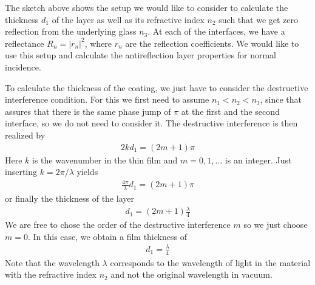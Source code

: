 \documentclass[letterpaper,10pt,english]{sphinxmanual}
\begin{document}
The sketch above shows the setup we would like to consider to calculate the thickness \(d_1\) of the layer as well as its refractive index \(n_2\) such that we get zero reflection from the underlying glass \(n_3\). At each of the interfaces, we have a reflectance \(R_n=|r_n|^2\), where \(r_n\) are the reflection coefficients. We would like to use this setup and calculate the anti\sphinxhyphen{}reflection layer properties for normal incidence.


To calculate the thickness of the coating, we just have to consider the destructive interference condition. For this we first need to assume \(n_1<n_2<n_3\), since that assures that there is the same phase jump of \(\pi\) at the first and the second interface, so we do not need to consider it. The destructive interference is then realized by
\begin{equation*}
\begin{split}2k d_1=(2m+1)\pi\end{split}
\end{equation*}
Here \(k\) is the wavenumber in the thin film and \(m=0,1,\ldots\) is an integer. Just inserting \(k=2\pi/\lambda\) yields
\begin{equation*}
\begin{split}\frac{4\pi}{\lambda} d_1=(2m+1)\pi\end{split}
\end{equation*}
or finally the thickness of the layer
\begin{equation*}
\begin{split}d_1=(2m+1)\frac{\lambda}{4}\end{split}
\end{equation*}
We are free to chose the order of the destructive interference \(m\) so we just choose \(m=0\). In this case, we obtain a film thickness of
\begin{equation*}
\begin{split}d_1=\frac{\lambda}{4}\end{split}
\end{equation*}
Note that the wavelength \(\lambda\) corresponds to the wavelength of light in the material with the refractive index \(n_2\) and not the original wavelength in vacuum.

\end{document}
